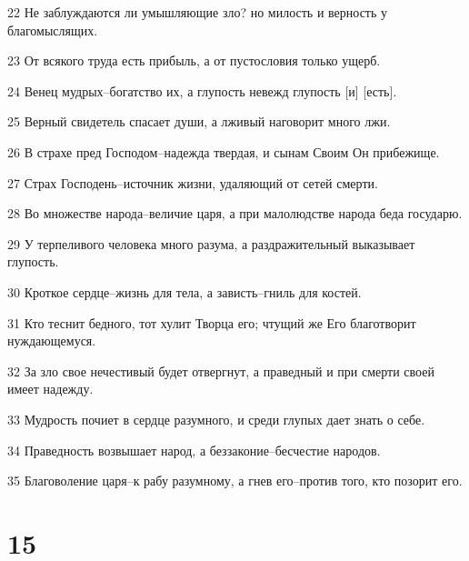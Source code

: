 \par 22 Не заблуждаются ли умышляющие зло? но милость и верность у благомыслящих.
\par 23 От всякого труда есть прибыль, а от пустословия только ущерб.
\par 24 Венец мудрых--богатство их, а глупость невежд глупость [и] [есть].
\par 25 Верный свидетель спасает души, а лживый наговорит много лжи.
\par 26 В страхе пред Господом--надежда твердая, и сынам Своим Он прибежище.
\par 27 Страх Господень--источник жизни, удаляющий от сетей смерти.
\par 28 Во множестве народа--величие царя, а при малолюдстве народа беда государю.
\par 29 У терпеливого человека много разума, а раздражительный выказывает глупость.
\par 30 Кроткое сердце--жизнь для тела, а зависть--гниль для костей.
\par 31 Кто теснит бедного, тот хулит Творца его; чтущий же Его благотворит нуждающемуся.
\par 32 За зло свое нечестивый будет отвергнут, а праведный и при смерти своей имеет надежду.
\par 33 Мудрость почиет в сердце разумного, и среди глупых дает знать о себе.
\par 34 Праведность возвышает народ, а беззаконие--бесчестие народов.
\par 35 Благоволение царя--к рабу разумному, а гнев его--против того, кто позорит его.

\chapter{15}

